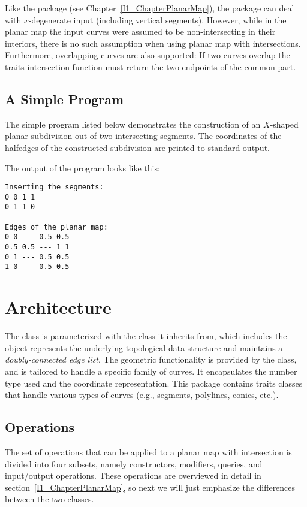 Like the  package (see Chapter~\ref{I1_ChapterPlanarMap}), 
the  package can deal with $x$-degenerate 
input (including vertical segments). However, while in the planar map the input
curves were assumed to be non-intersecting in their interiors, there is no 
such assumption when using planar map with intersections. Furthermore, 
overlapping curves are also supported: If two curves overlap the traits 
intersection function must return the two endpoints of the common part.

\subsection{A Simple Program}
\label{ssec:example1}
The simple program listed below demonstrates the construction of an
$X$-shaped planar subdivision out of two intersecting segments.
The coordinates of the halfedges of the constructed subdivision are
printed to standard output.


The output of the program looks like this:
\begin{verbatim}
Inserting the segments:
0 0 1 1
0 1 1 0

Edges of the planar map:
0 0 --- 0.5 0.5
0.5 0.5 --- 1 1
0 1 --- 0.5 0.5
1 0 --- 0.5 0.5
\end{verbatim}

\section{Architecture}

The  class 
is parameterized with the  class it inherits from, which 
includes the  object represents the underlying topological data structure and maintains a {\em doubly-connected edge list}. 
The geometric functionality is provided by the  class, and is
tailored to handle a specific family of curves. It encapsulates the
number type used and the coordinate representation. This package
contains traits classes that handle various types of curves (e.g.,
segments, polylines, conics, etc.).

\subsection{Operations}
The set of operations that can be applied to a planar map with intersection 
is divided into four subsets, namely constructors, modifiers, queries, and
input/output operations. These operations are overviewed in detail in
section~\ref{I1_ChapterPlanarMap}, so next we will just emphasize the 
differences between the two classes.

